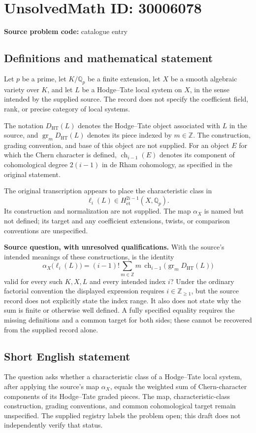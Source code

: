 \documentclass[11pt]{article}
\newcommand{\Z}{\mathbb{Z}}
\newcommand{\Q}{\mathbb{Q}}
\begin{document}
\section*{UnsolvedMath ID: 30006078}
\textbf{Source problem code:} catalogue entry
\subsection{Definitions and mathematical statement}
Let \(p\) be a prime, let \(K/\Q_p\) be a finite extension, let \(X\) be a smooth algebraic variety over \(K\), and let \(L\) be a Hodge--Tate local system on \(X\), in the sense intended by the supplied source. The record does not specify the coefficient field, rank, or precise category of local systems.

The notation \(D_{\mathrm{HT}}(L)\) denotes the Hodge--Tate object associated with \(L\) in the source, and \(\operatorname{gr}_mD_{\mathrm{HT}}(L)\) denotes its piece indexed by \(m\in\Z\). The construction, grading convention, and base of this object are not supplied. For an object \(E\) for which the Chern character is defined, \(\operatorname{ch}_{i-1}(E)\) denotes its component of cohomological degree \(2(i-1)\) in de Rham cohomology, as specified in the original statement.

The original transcription appears to place the characteristic class in
\[
\ell_i(L)\in H^{2i-1}_{\mathrm{\acute{e}t}}(X,\Q_p).
\]
Its construction and normalization are not supplied. The map \(\alpha_X\) is named but not defined; its target and any coefficient extensions, twists, or comparison conventions are unspecified.

\textbf{Source question, with unresolved qualifications.} With the source's intended meanings of these constructions, is the identity
\[
\alpha_X\bigl(\ell_i(L)\bigr)
=
(i-1)!\sum_{m\in\Z}m\,
\operatorname{ch}_{i-1}\bigl(\operatorname{gr}_mD_{\mathrm{HT}}(L)\bigr)
\]
valid for every such \(K,X,L\) and every intended index \(i\)? Under the ordinary factorial convention the displayed expression requires \(i\in\Z_{\geq1}\), but the source record does not explicitly state the index range. It also does not state why the sum is finite or otherwise well defined. A fully specified equality requires the missing definitions and a common target for both sides; these cannot be recovered from the supplied record alone.
\subsection{Short English statement}
The question asks whether a characteristic class of a Hodge--Tate local system, after applying the source's map \(\alpha_X\), equals the weighted sum of Chern-character components of its Hodge--Tate graded pieces. The map, characteristic-class construction, grading conventions, and common cohomological target remain unspecified. The supplied registry labels the problem open; this draft does not independently verify that status.
\end{document}

